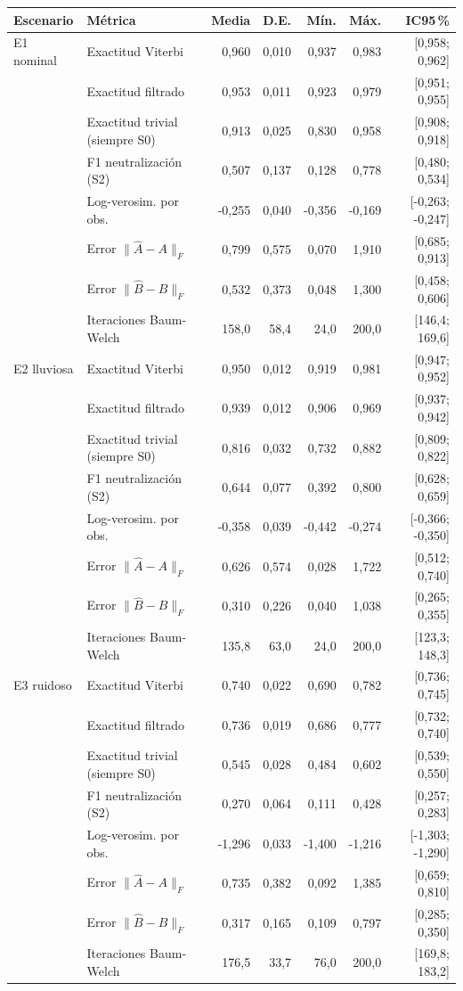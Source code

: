 \begin{tabular}{llrrrrr}
\toprule
Escenario & Métrica & Media & D.E. & Mín. & Máx. & IC95\,\% \\
\midrule
E1 nominal & Exactitud Viterbi & 0,960 & 0,010 & 0,937 & 0,983 & [0,958; 0,962] \\
 & Exactitud filtrado & 0,953 & 0,011 & 0,923 & 0,979 & [0,951; 0,955] \\
 & Exactitud trivial (siempre S0) & 0,913 & 0,025 & 0,830 & 0,958 & [0,908; 0,918] \\
 & F1 neutralización (S2) & 0,507 & 0,137 & 0,128 & 0,778 & [0,480; 0,534] \\
 & Log-verosim. por obs. & -0,255 & 0,040 & -0,356 & -0,169 & [-0,263; -0,247] \\
 & Error $\|\hat A-A\|_F$ & 0,799 & 0,575 & 0,070 & 1,910 & [0,685; 0,913] \\
 & Error $\|\hat B-B\|_F$ & 0,532 & 0,373 & 0,048 & 1,300 & [0,458; 0,606] \\
 & Iteraciones Baum-Welch & 158,0 & 58,4 & 24,0 & 200,0 & [146,4; 169,6] \\
\midrule
E2 lluviosa & Exactitud Viterbi & 0,950 & 0,012 & 0,919 & 0,981 & [0,947; 0,952] \\
 & Exactitud filtrado & 0,939 & 0,012 & 0,906 & 0,969 & [0,937; 0,942] \\
 & Exactitud trivial (siempre S0) & 0,816 & 0,032 & 0,732 & 0,882 & [0,809; 0,822] \\
 & F1 neutralización (S2) & 0,644 & 0,077 & 0,392 & 0,800 & [0,628; 0,659] \\
 & Log-verosim. por obs. & -0,358 & 0,039 & -0,442 & -0,274 & [-0,366; -0,350] \\
 & Error $\|\hat A-A\|_F$ & 0,626 & 0,574 & 0,028 & 1,722 & [0,512; 0,740] \\
 & Error $\|\hat B-B\|_F$ & 0,310 & 0,226 & 0,040 & 1,038 & [0,265; 0,355] \\
 & Iteraciones Baum-Welch & 135,8 & 63,0 & 24,0 & 200,0 & [123,3; 148,3] \\
\midrule
E3 ruidoso & Exactitud Viterbi & 0,740 & 0,022 & 0,690 & 0,782 & [0,736; 0,745] \\
 & Exactitud filtrado & 0,736 & 0,019 & 0,686 & 0,777 & [0,732; 0,740] \\
 & Exactitud trivial (siempre S0) & 0,545 & 0,028 & 0,484 & 0,602 & [0,539; 0,550] \\
 & F1 neutralización (S2) & 0,270 & 0,064 & 0,111 & 0,428 & [0,257; 0,283] \\
 & Log-verosim. por obs. & -1,296 & 0,033 & -1,400 & -1,216 & [-1,303; -1,290] \\
 & Error $\|\hat A-A\|_F$ & 0,735 & 0,382 & 0,092 & 1,385 & [0,659; 0,810] \\
 & Error $\|\hat B-B\|_F$ & 0,317 & 0,165 & 0,109 & 0,797 & [0,285; 0,350] \\
 & Iteraciones Baum-Welch & 176,5 & 33,7 & 76,0 & 200,0 & [169,8; 183,2] \\
\bottomrule
\end{tabular}